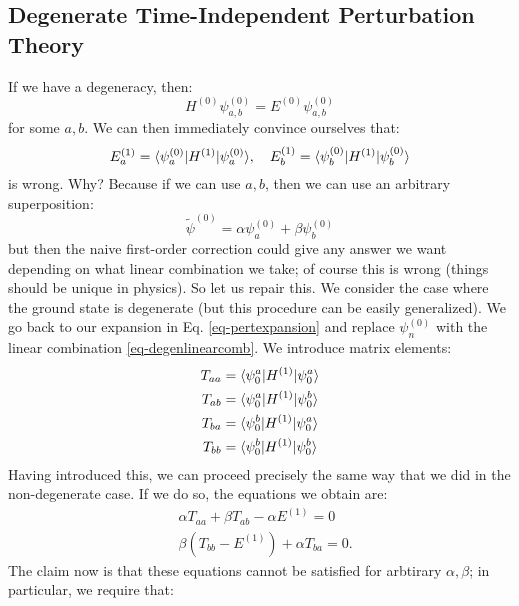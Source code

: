 \subsection{Degenerate Time-Independent Perturbation Theory}
If we have a degeneracy, then:
\begin{equation}
    H^{(0)}\psi_{a, b}^{(0)} = E^{(0)}\psi_{a, b}^{(0)}
\end{equation}
for some $a, b$. We can then immediately convince ourselves that:
\begin{equation}
    E_a^{(1)} = \langle \psi_a^{(0)} \rvert H^{(1)}\lvert \psi_a^{(0)} \rangle, \quad E_b^{(1)} = \langle \psi_b^{(0)} \rvert H^{(1)}\lvert \psi_b^{(0)} \rangle
\end{equation}
is wrong. Why? Because if we can use $a, b$, then we can use an arbitrary superposition:
\begin{equation}\label{eq-degenlinearcomb}
    \tilde{\psi}^{(0)} = \alpha\psi_a^{(0)} + \beta\psi_b^{(0)}
\end{equation}
but then the naive first-order correction could give any answer we want depending on what linear combination we take; of course this is wrong (things should be unique in physics). So let us repair this. We consider the case where the ground state is degenerate (but this procedure can be easily generalized). We go back to our expansion in Eq. \eqref{eq-pertexpansion} and replace $\psi_n^{(0)}$ with the linear combination \eqref{eq-degenlinearcomb}. We introduce matrix elements:
\begin{equation}
    \begin{split}
        T_{aa} &= \langle \psi_0^a \rvert H^{(1)}\lvert \psi_0^a \rangle
        \\T_{ab} &= \langle \psi_0^a \rvert H^{(1)}\lvert \psi_0^b \rangle
        \\T_{ba} &= \langle \psi_0^b \rvert H^{(1)}\lvert \psi_0^a \rangle
        \\T_{bb} &= \langle \psi_0^b \rvert H^{(1)}\lvert \psi_0^b \rangle
    \end{split}
\end{equation}
Having introduced this, we can proceed precisely the same way that we did in the non-degenerate case. If we do so, the equations we obtain are:
\begin{equation}
    \begin{split}
        &\alpha T_{aa} + \beta T_{ab} - \alpha E^{(1)} = 0
        \\ &\beta(T_{bb} - E^{(1)}) + \alpha T_{ba} = 0.
    \end{split}
\end{equation}
The claim now is that these equations cannot be satisfied for arbtirary $\alpha, \beta$; in particular, we require that:
